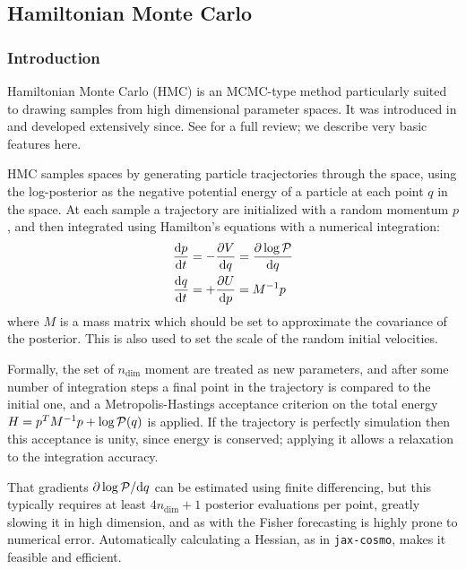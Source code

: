\documentclass[final,5p,times,twocolumn,authoryear]{elsarticle}
\newcommand{\jaxcosmo}{\texttt{jax-cosmo}}
\begin{document}
\subsection{Hamiltonian Monte Carlo}

\subsubsection{Introduction}

Hamiltonian Monte Carlo (HMC) is an MCMC-type method particularly suited to drawing
samples from high dimensional parameter spaces.  It was introduced in \citep{1987PhLB..195..216D}
and developed extensively since.  See \citet{betancourt} for a full review; we describe
very basic features here.

HMC samples spaces by generating particle tracjectories through the space, using the log-posterior
as the negative potential energy of a particle at each point $q$ in the space.  At each sample a trajectory are initialized
with a random momentum $p$, and then integrated using Hamilton's equations with a numerical integration:
\begin{align}
\frac{\mathrm{d}p}{\mathrm{d}t} &= - \frac{\partial V}{\mathrm{d} q} = \frac{\partial \log{\cal P}}{\mathrm{d} q}\\
\frac{\mathrm{d}q}{\mathrm{d}t} &= + \frac{\partial U}{\mathrm{d} p} = M^{-1} p
\end{align}
where $M$ is a mass matrix which should be set to approximate the covariance of the posterior. This is also
used to set the scale of the random initial velocities.

Formally, the set of $n_\mathrm{dim}$ moment are treated as new parameters, and after 
some number of integration steps a final point in the trajectory is compared to the initial one,
and a Metropolis-Hastings acceptance criterion on the total energy $H = p^T M^{-1} p + \log{\cal P}(q)$ is applied.
If the trajectory is perfectly simulation then this acceptance is unity, since energy is conserved; applying it allows
a relaxation to the integration accuracy.

That gradients $\partial \log{\cal P} / \mathrm{d} q$ can be estimated using finite differencing,
but this typically requires at least $4 n_{\mathrm{dim}} + 1$ posterior evaluations per point, greatly slowing it
in high dimension, and as with the Fisher forecasting is highly prone to numerical error. Automatically
calculating a Hessian, as in \jaxcosmo, makes it feasible and efficient.
\end{document}
